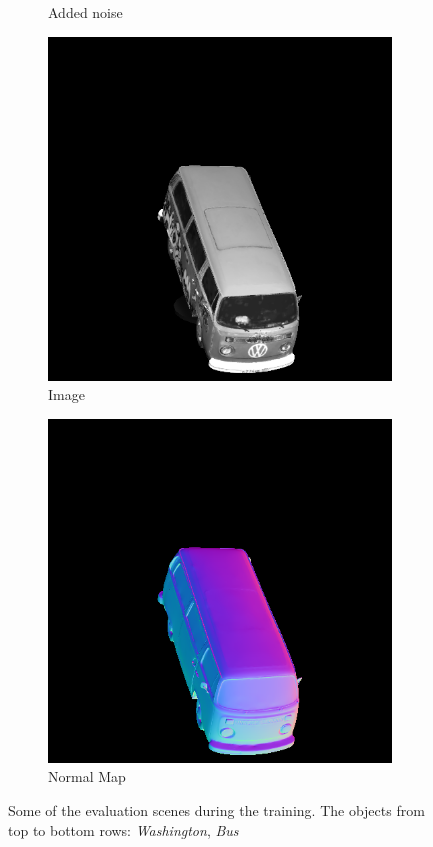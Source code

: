 \begin{figure}[H]
\begin{subfigure}[b]{0.24\linewidth}
		\caption{Added noise}
	\end{subfigure}
	\begin{subfigure}[b]{0.24\linewidth}
		\includegraphics[width=\linewidth]{./Figures/test_scenes/05126.image0.png}
		\caption{Image}
	\end{subfigure}
	\begin{subfigure}[b]{0.24\linewidth}
		\includegraphics[width=\linewidth]{./Figures/test_scenes/05126.normal0.png}
		\caption{Normal Map}
	\end{subfigure}
	\decoRule
	\caption{Some of the evaluation scenes during the training. The objects from top to bottom rows: \textit{ Washington}, \textit{Bus}}
	\label{fig:test-scene}
\end{figure}


